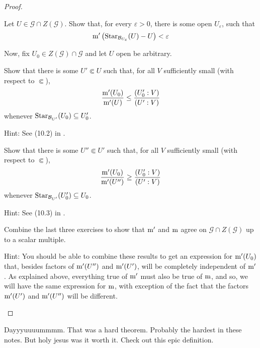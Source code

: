 \begin{thm}
\begin{savenotes}
\begin{proof}
\begin{exr}
Let $U\in \mathcal{G}\cap Z(\mathcal{G})$.  Show that, for every $\varepsilon >0$, there is some open $U_\varepsilon$, such that
\begin{equation}
\mathrm{m} '\left( \operatorname{Star} _{\mathcal{B}_{U_{\varepsilon}}}(U)-U\right) <\varepsilon 
\end{equation}
\end{exr}
Now, fix $U_0\in Z(\mathcal{G})\cap \mathcal{G}$ and let $U$ open be arbitrary.
\begin{exr}
Show that there is some $U'\Subset U$ such that, for all $V$ sufficiently small (with respect to $\Subset$),
\begin{equation}
\frac{\mathrm{m} '(U_0)}{\mathrm{m} '(U)}\leq \frac{(U_0':V)}{(U':V)}
\end{equation}
whenever $\operatorname{Star} _{\mathcal{B}_{U'}}(U_0)\subseteq U_0'$.
\begin{rmk}
Hint:  See (10.2) in \cite{Howes}.
\end{rmk}
\end{exr}
\begin{exr}
Show that there is some $U''\Subset U'$ such that, for all $V$ sufficiently small (with respect to $\Subset$),
\begin{equation}
\frac{\mathrm{m} '(U_0)}{\mathrm{m} '(U'')}\geq \frac{(U_0':V)}{(U':V)}
\end{equation}
whenever $\operatorname{Star} _{\mathcal{B}_{U'}}(U_0')\subseteq U_0$.
\begin{rmk}
Hint:  See (10.3) in \cite{Howes}.
\end{rmk}
\end{exr}
\begin{exr}
Combine the last three exercises to show that $\mathrm{m} '$ and $\mathrm{m}$ agree on $\mathcal{G}\cap Z(\mathcal{G})$ up to a scalar multiple.
\begin{rmk}
Hint:  You should be able to combine these results to get an expression for $\mathrm{m} '(U_0)$ that, besides factors of $\mathrm{m} '(U'')$ and $\mathrm{m} '(U')$, will be completely independent of $\mathrm{m} '$.  As explained above, everything true of $\mathrm{m} '$ must also be true of $\mathrm{m}$, and so, we will have the same expression for $\mathrm{m}$, with exception of the fact that the factors $\mathrm{m} '(U')$ and $\mathrm{m} '(U'')$ will be different.
\end{rmk}
\end{exr}
\end{proof}
\end{savenotes}
\end{thm}
Dayyyuuuummmm.  That was a hard theorem.  Probably the hardest in these notes.  But holy jesus was it worth it.  Check out this epic definition.
